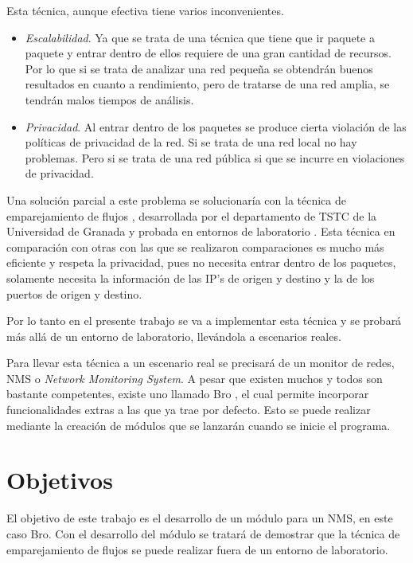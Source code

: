 \intro Esta técnica, aunque efectiva tiene varios inconvenientes.
\begin{itemize}
\item \textit{Escalabilidad}. Ya que se trata de una técnica que tiene que ir paquete a paquete y entrar dentro de ellos requiere de 
una gran cantidad de recursos. Por lo que si se trata de analizar una red pequeña se obtendrán buenos resultados en cuanto a 
rendimiento, pero de tratarse de una red amplia, se tendrán malos tiempos de análisis.
\item \textit{Privacidad}. Al entrar dentro de los paquetes se produce cierta violación de las políticas de privacidad de la red. Si 
se trata de una red local no hay problemas. Pero si se trata de una red pública si que se incurre en violaciones de privacidad.
\end{itemize}

\intro Una solución parcial a este problema se solucionaría con la técnica de emparejamiento de flujos \cite{presentacion}, 
desarrollada por el departamento de TSTC de la Universidad de Granada y probada en entornos de laboratorio \cite{comparacion}. 
Esta técnica en comparación con otras con las que se realizaron comparaciones es mucho más eficiente y respeta la privacidad, 
pues no necesita entrar dentro de los paquetes, solamente necesita la información de las IP's de origen y destino y la de los 
puertos de origen y destino.

\intro Por lo tanto en el presente trabajo se va a implementar esta técnica y se probará más allá de un entorno de laboratorio, 
llevándola a escenarios reales.

\intro Para llevar esta técnica a un escenario real se precisará de un monitor de redes, NMS o \textit{Network Monitoring System}. 
A pesar que existen muchos y todos son bastante competentes, existe uno llamado Bro \cite{broindex}, el cual permite 
incorporar funcionalidades extras a las que ya trae por defecto. Esto se puede realizar mediante la creación de módulos que se 
lanzarán cuando se inicie el programa.

\section{Objetivos}

El objetivo de este trabajo es el desarrollo de un módulo para un NMS, en este caso Bro. Con el desarrollo del módulo se tratará 
de demostrar que la técnica de emparejamiento de flujos se puede realizar fuera de un entorno de laboratorio.

